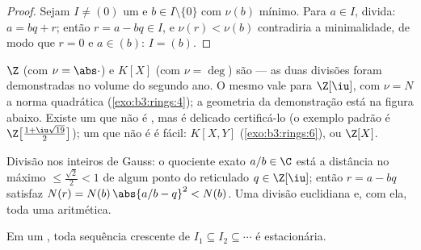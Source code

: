 \begin{proof}
Sejam $I \neq (0)$ um  e $b \in I \setminus\{0\}$ com $\nu(b)$ mínimo. Para $a \in I$,
divida: $a = bq + r$; então $r = a
- bq \in I$, e $\nu(r) < \nu(b)$ contradiria a minimalidade, de modo
que $r = 0$ e $a \in (b)$: $I = (b)$.
\end{proof}

\begin{example}\label{ex:b3:rings:euclidean}
$\Z$ (com $\nu = \abs\cdot$) e $K[X]$ (com $\nu = \deg$) são  --- as
duas divisões foram demonstradas no volume do segundo ano. O mesmo vale
para $\Z[\iu]$, com $\nu = N$ a norma quadrática (\cref{exo:b3:rings:4}); a geometria
da demonstração está na figura abaixo. Existe um  que não é
, mas é delicado certificá-lo (o exemplo padrão é $\Z\bigl[\frac{1+\iu\sqrt{19}}2\bigr]$); um
 que não é  é fácil: $K[X, Y]$ (\cref{exo:b3:rings:6}), ou $\Z[X]$.
\end{example}

\begin{omfigure}

{\small Divisão nos inteiros de Gauss: o quociente exato $a/b \in \C$ está a
distância no máximo $\leq \frac{\sqrt2}{2} < 1$ de algum ponto do reticulado $q \in \Z[\iu]$; então
$r = a - bq$ satisfaz $N(r) =
N(b)\,\abs{a/b - q}^2 < N(b)$. Uma divisão euclidiana e, com ela, toda uma
aritmética.}
\end{omfigure}

\begin{lemma}
\label{lem:b3:rings:acc}
Em um , toda sequência crescente de  $I_1 \subseteq I_2
\subseteq \cdots$ é estacionária.
\end{lemma}

